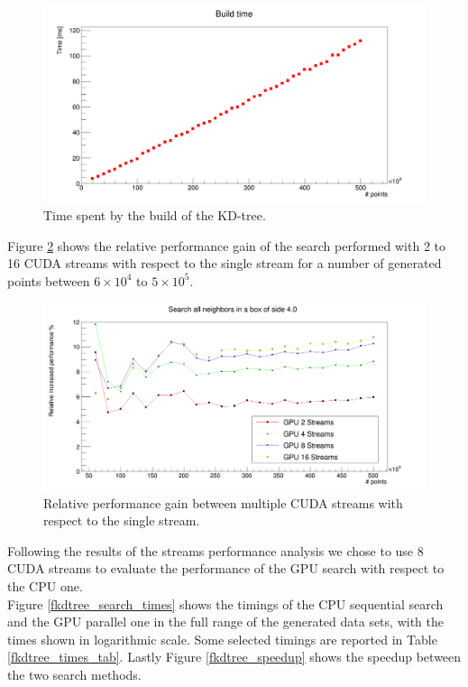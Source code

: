 \begin{figure}
\includegraphics[width=\textwidth]{fkdtree/fkdBuildTimes.png}
\caption{Time spent by the build of the KD-tree.}
\label{fkdtree_build_times}
\end{figure}

Figure \ref{fkdtree_streams} shows the relative performance gain of the search performed with 2 to 16 CUDA streams with respect to the single stream for a number of generated points between $6 \times 10^4$ to $5 \times 10^5$.\\
\begin{figure}
\includegraphics[width=\textwidth]{fkdtree/fkdStreams.png}
\caption{Relative performance gain between multiple CUDA streams with respect to the single stream.}
\label{fkdtree_streams}
\end{figure}

Following the results of the streams performance analysis we chose to use 8 CUDA streams to evaluate the performance of the GPU search with respect to the CPU one.\\
Figure \ref{fkdtree_search_times} shows the timings of the CPU sequential search and the GPU parallel one in the full range of the generated data sets, with the times shown in logarithmic scale.
Some selected timings are reported in Table \ref{fkdtree_times_tab}.
Lastly Figure \ref{fkdtree_speedup} shows the speedup between the two search methods.

